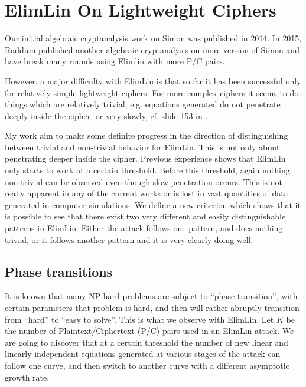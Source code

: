 
\section{ElimLin On Lightweight Ciphers}
Our initial algebraic cryptanalysis work on Simon was published in 2014. In 2015,   Raddum \cite{RaddumSimon} published another algebraic cryptanalysis on more version of Simon and have break many rounds using Elimlin with more P/C pairs. 

 
However, a major difficulty with ElimLin is that so far it has been successful only for relatively simple lightweight ciphers.
For more complex ciphers
it seems to do things which are relatively trivial,
e.g. equations generated do not penetrate deeply inside the cipher, or very slowly,
cf. %
slide 153 in \cite{SlidesAlgAllteach}.

My work aim to make some definite progress in the direction of distinguishing between trivial and non-trivial behavior for ElimLin. This is not only about penetrating deeper inside the cipher. Previous experience shows that ElimLin only starts to work at a certain threshold. Before this threshold, again nothing non-trivial can be observed even though slow penetration occurs. This is not really apparent in any of the current works or is lost in vast quantities of data generated in computer simulations. 
We define a new criterion which shows that it is possible to see that there exist two very different and easily distinguishable patterns in ElimLin. Either the attack follows one pattern, and does nothing trivial, or it follows another pattern and it is very clearly doing well.

\subsection{Phase transitions}

It is known that many NP-hard problems are subject to ``phase transition'', with certain parameters that problem is hard, and then will rather abruptly transition from ``hard'' to ``easy to solve''. This is what we observe with ElimLin. %
Let $K$ be the number of Plaintext/Ciphertext (P/C) pairs used in an ElimLin attack. We are going to discover that at a certain threshold the number of new linear and linearly independent equations
generated at various stages of the attack can follow one curve,
and then switch to another curve with a different asymptotic growth rate.



